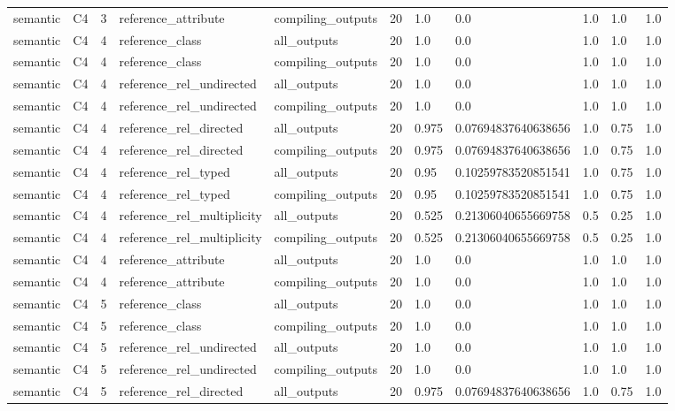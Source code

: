 \begin{tabular}{lllllllllll}
semantic & C4 & 3 & reference\_attribute & compiling\_outputs & 20 & 1.0 & 0.0 & 1.0 & 1.0 & 1.0 \\
semantic & C4 & 4 & reference\_class & all\_outputs & 20 & 1.0 & 0.0 & 1.0 & 1.0 & 1.0 \\
semantic & C4 & 4 & reference\_class & compiling\_outputs & 20 & 1.0 & 0.0 & 1.0 & 1.0 & 1.0 \\
semantic & C4 & 4 & reference\_rel\_undirected & all\_outputs & 20 & 1.0 & 0.0 & 1.0 & 1.0 & 1.0 \\
semantic & C4 & 4 & reference\_rel\_undirected & compiling\_outputs & 20 & 1.0 & 0.0 & 1.0 & 1.0 & 1.0 \\
semantic & C4 & 4 & reference\_rel\_directed & all\_outputs & 20 & 0.975 & 0.07694837640638656 & 1.0 & 0.75 & 1.0 \\
semantic & C4 & 4 & reference\_rel\_directed & compiling\_outputs & 20 & 0.975 & 0.07694837640638656 & 1.0 & 0.75 & 1.0 \\
semantic & C4 & 4 & reference\_rel\_typed & all\_outputs & 20 & 0.95 & 0.10259783520851541 & 1.0 & 0.75 & 1.0 \\
semantic & C4 & 4 & reference\_rel\_typed & compiling\_outputs & 20 & 0.95 & 0.10259783520851541 & 1.0 & 0.75 & 1.0 \\
semantic & C4 & 4 & reference\_rel\_multiplicity & all\_outputs & 20 & 0.525 & 0.21306040655669758 & 0.5 & 0.25 & 1.0 \\
semantic & C4 & 4 & reference\_rel\_multiplicity & compiling\_outputs & 20 & 0.525 & 0.21306040655669758 & 0.5 & 0.25 & 1.0 \\
semantic & C4 & 4 & reference\_attribute & all\_outputs & 20 & 1.0 & 0.0 & 1.0 & 1.0 & 1.0 \\
semantic & C4 & 4 & reference\_attribute & compiling\_outputs & 20 & 1.0 & 0.0 & 1.0 & 1.0 & 1.0 \\
semantic & C4 & 5 & reference\_class & all\_outputs & 20 & 1.0 & 0.0 & 1.0 & 1.0 & 1.0 \\
semantic & C4 & 5 & reference\_class & compiling\_outputs & 20 & 1.0 & 0.0 & 1.0 & 1.0 & 1.0 \\
semantic & C4 & 5 & reference\_rel\_undirected & all\_outputs & 20 & 1.0 & 0.0 & 1.0 & 1.0 & 1.0 \\
semantic & C4 & 5 & reference\_rel\_undirected & compiling\_outputs & 20 & 1.0 & 0.0 & 1.0 & 1.0 & 1.0 \\
semantic & C4 & 5 & reference\_rel\_directed & all\_outputs & 20 & 0.975 & 0.07694837640638656 & 1.0 & 0.75 & 1.0 \\

\end{tabular}
